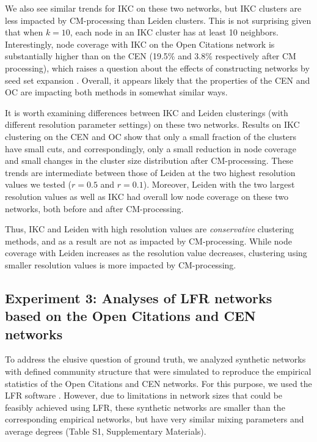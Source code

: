 \documentclass[11pt]{article}   	%
\begin{document}
We also see similar trends for IKC on these two networks, but IKC clusters are less impacted by CM-processing than Leiden clusters. This is not surprising given that when $k=10$, each node in an IKC cluster
has at least 10 neighbors. Interestingly, node coverage with IKC on the Open Citations network is substantially higher than on the CEN (19.5\% and 3.8\% respectively after CM processing), which raises a question about
the effects of constructing networks by seed set expansion \cite{Wedell2022}. Overall, it appears likely that the properties of the CEN and OC are impacting both methods in somewhat similar ways.

It is worth examining differences between IKC and Leiden clusterings (with different resolution parameter settings) on these two networks.
Results on IKC clustering on the CEN and OC show that only a small fraction of the clusters have small cuts, and correspondingly,
only a small reduction in node coverage and small changes in the cluster size distribution after CM-processing. 
These trends  are intermediate between those of Leiden at the two highest resolution values we tested ($r=0.5$ and $r=0.1$).
Moreover, Leiden with the two largest resolution values as well as IKC had overall low node coverage on these two networks, both before and after CM-processing.

Thus, IKC and Leiden with high resolution values are {\em conservative} clustering methods, and as a result are not as impacted by CM-processing.
While node coverage with Leiden increases as the resolution value decreases, clustering using smaller resolution values is more impacted by CM-processing.




\subsection{Experiment 3: Analyses of LFR networks based on the Open Citations and CEN networks}

To address the elusive question of ground truth, we analyzed synthetic networks with defined community structure that were simulated to reproduce the empirical statistics of the Open Citations and CEN networks. For this purpose,
we used the LFR software \cite{lancichinetti2008benchmark}. However, due to limitations in network sizes that could be feasibly achieved using LFR, these synthetic networks are smaller than the corresponding
empirical networks, but have very similar mixing parameters and average degrees (Table S1, Supplementary Materials). 
\end{document}
